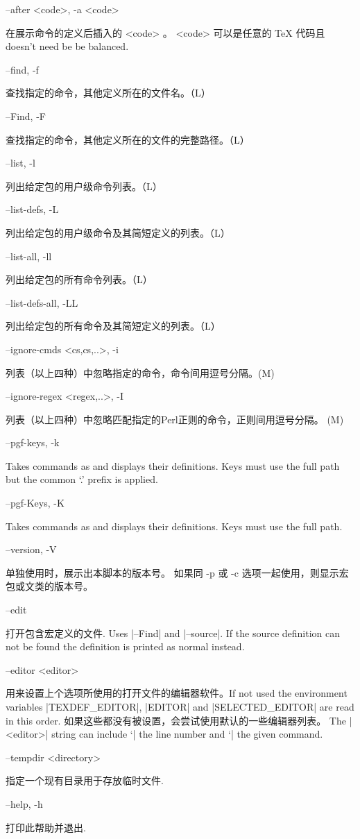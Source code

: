 \documentclass{article}
\newenvironment{options}{%
    \def\cstart{\begingroup\ttfamily\par\noindent\ignorespaces}%
    \def\csep{\endgroup\begingroup\list {}{}\item \relax}%
    \def\cend{\endlist\par\medskip\endgroup\cstart}%
    \cstart
}{%
    \endgroup
}
\begin{document}
\begin{options}
  
  
  

  
  --after  \MacroArgs<code>, -a \MacroArgs<code>     \csep 在展示命令的定义后插入的 \MacroArgs<code> 。
                                                       \MacroArgs<code> 可以是任意的 TeX 代码且 doesn't need be be balanced.\cend
  --find, -f                                         \csep 查找指定的命令，其他定义所在的文件名。（L）\cend
  --Find, -F                                         \csep 查找指定的命令，其他定义所在的文件的完整路径。（L）\cend
  --list, -l                                         \csep 列出给定包的用户级命令列表。（L）\cend
  --list-defs, -L                                    \csep 列出给定包的用户级命令及其简短定义的列表。（L）\cend
  --list-all, -ll                                    \csep 列出给定包的所有命令列表。（L）\cend
  --list-defs-all, -LL                               \csep 列出给定包的所有命令及其简短定义的列表。（L）\cend
  --ignore-cmds \MacroArgs<cs,cs,..>,  -i            \csep 列表（以上四种）中忽略指定的命令，命令间用逗号分隔。(M)\cend
  --ignore-regex \MacroArgs<regex,..>, -I            \csep 列表（以上四种）中忽略匹配指定的Perl正则的命令，正则间用逗号分隔。 (M)\cend
  --pgf-keys, -k                                     \csep Takes commands as  and displays their definitions. Keys must use the full path but the common `.\@cmd' prefix is applied.\cend
  --pgf-Keys, -K                                     \csep Takes commands as  and displays their definitions. Keys must use the full path.\cend
  --version, -V                                      \csep 单独使用时，展示出本脚本的版本号。
                                                       如果同 -p 或 -c 选项一起使用，则显示宏包或文类的版本号。\cend
  --edit                                             \csep 打开包含宏定义的文件. Uses |--Find| and |--source|.
                                                           If the source definition can not be found the definition is printed as normal instead. \cend
  --editor <editor>                                  \csep 用来设置上个选项所使用的打开文件的编辑器软件。If not used the environment variables |TEXDEF_EDITOR|, |EDITOR| and
                                                       |SELECTED_EDITOR| are read in this order. 如果这些都没有被设置，会尝试使用默认的一些编辑器列表。
                                                       The |<editor>| string can include `|%
                                                       the line number and `|%
                                                       the given command.\cend
  --tempdir <directory>                              \csep 指定一个现有目录用于存放临时文件.\cend
  --help, -h                                         \csep 打印此帮助并退出.\cend
\end{options}
\end{document}
